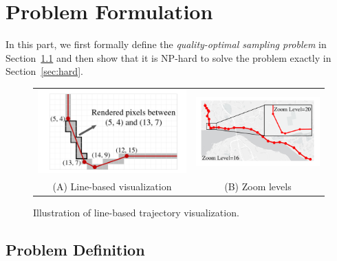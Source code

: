 \section{Problem Formulation}\label{sec:pro}
In this part, we first formally define the \textit{quality-optimal sampling problem} in Section~\ref{sec:def} and then show that it is NP-hard to solve the problem exactly in Section~\ref{sec:hard}.

\begin{figure}
	\centering
	\small
	\begin{tabular}{cc}
        \includegraphics[width=0.43\columnwidth]{pictures/problemsolveing/RenderedPixels}
		&
        \includegraphics[width=0.48\columnwidth]{pictures/problemsolveing/TrajZoomIn}		
		\\
		(A) Line-based visualization
		&
        (B) Zoom levels
	\end{tabular}
	\vspace{-4mm}
	\caption{Illustration of line-based trajectory visualization.} \label{fig:line}
	\vspace{-6mm}
\end{figure}


\subsection{Problem Definition}\label{sec:def}


